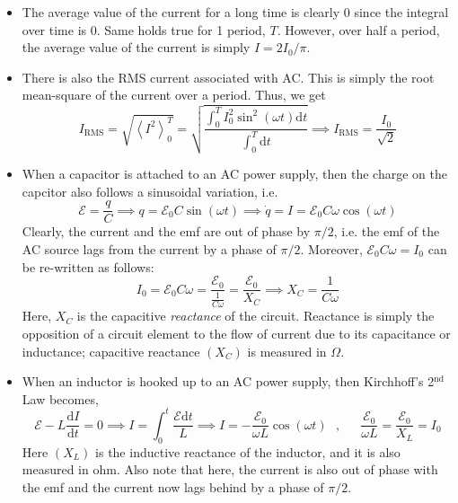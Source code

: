 \documentclass{scrartcl}
\begin{document}
    \begin{itemize}
        \item The average value of the current for a long time is clearly 0 since the integral over time is 0. Same holds true for 1 period, $T$. However, over half a period, the average value of the current is simply $I=2I_0/\pi$.
        \item There is also the RMS current associated with AC. This is simply the root mean-square of the current over a period. Thus, we get \[I_\text{RMS}=\sqrt{\left\langle I^2\right\rangle_0^T}=\sqrt{\frac{\int_0^TI_0^2\sin^2\left(\omega t\right)\mathrm dt}{\int_0^T\mathrm dt}}\implies\boxed{I_\text{RMS}=\frac{I_0}{\sqrt2}}\]
        \item When a capacitor is attached to an AC power supply, then the charge on the capcitor also follows a sinusoidal variation, i.e. \[\mathcal E=\frac qC\implies q=\mathcal E_0C\sin\left(\omega t\right)\implies \dot q=I=\mathcal E_0C\omega\cos\left(\omega t\right)\] Clearly, the current and the emf are out of phase by $\pi/2$, i.e. the emf of the AC source lags from the current by a phase of $\pi/2$. Moreover, $\mathcal E_0C\omega=I_0$ can be re-written as follows: \[I_0=\mathcal E_0C\omega=\frac{\mathcal E_0}{\frac1{C\omega}}=\frac{\mathcal E_0}{X_C}\implies\boxed{X_C=\frac1{C\omega}}\] Here, $X_C$ is the capacitive \textit{reactance} of the circuit. Reactance is simply the opposition of a circuit element to the flow of current due to its capacitance or inductance; capacitive reactance $\left(X_C\right)$ is measured in $\Omega$.
        \item When an inductor is hooked up to an AC power supply, then Kirchhoff's 2$^\text{nd}$ Law becomes, \[\mathcal E-L\frac{\mathrm dI}{\mathrm dt}=0\implies I=\int_0^t\frac{\mathcal E\mathrm dt}L\implies\boxed{I=-\frac{\mathcal E_0}{\omega L}\cos\left(\omega t\right)}\text{ }\text{, }\text{ }\text{ }\frac{\mathcal E_0}{\omega L}=\frac{\mathcal E_0}{X_L}=I_0\] Here $\left(X_L\right)$ is the inductive reactance of the inductor, and it is also measured in ohm. Also note that here, the current is also out of phase with the emf and the current now lags behind by a phase of $\pi/2$.
    \end{itemize}
\end{document}
